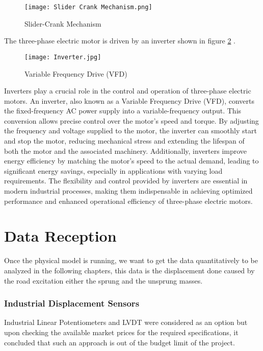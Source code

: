 \begin{figure}[H]
    \centering
    \texttt{[image: Slider Crank Mechanism.png]}
    \caption{Slider-Crank Mechanism}
    \label{fig:Slider-Crank Mechanism}
\end{figure}

The three-phase electric motor is driven by an inverter shown in figure \ref{fig:Inverter} .  
\begin{figure}[H]
    \centering
    \texttt{[image: Inverter.jpg]}
    \caption{Variable Frequency Drive (VFD)}
    \label{fig:Inverter}
    
\end{figure}
Inverters play a crucial role in the control and operation of three-phase electric motors. An inverter, also known as a Variable Frequency Drive (VFD), converts the fixed-frequency AC power supply into a variable-frequency output. This conversion allows precise control over the motor’s speed and torque. By adjusting the frequency and voltage supplied to the motor, the inverter can smoothly start and stop the motor, reducing mechanical stress and extending the lifespan of both the motor and the associated machinery. Additionally, inverters improve energy efficiency by matching the motor’s speed to the actual demand, leading to significant energy savings, especially in applications with varying load requirements. The flexibility and control provided by inverters are essential in modern industrial processes, making them indispensable in achieving optimized performance and enhanced operational efficiency of three-phase electric motors.
\newpage

\section{Data Reception}
Once the physical model is running, we want to get the data quantitatively to be analyzed in the following chapters, this data is the displacement done caused by the road excitation either the sprung and the unsprung masses.

\subsubsection{Industrial Displacement Sensors}

Industrial Linear Potentiometers and LVDT were considered as an option but upon checking the available market prices for the required specifications, it concluded that such an approach is out of the budget limit of the project.

